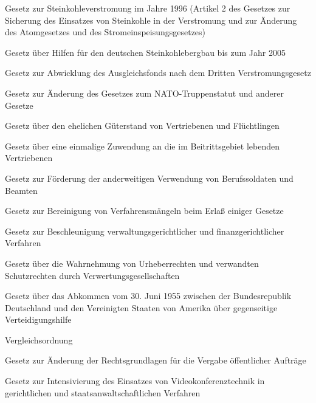 \item[{VerstromG-4}] Gesetz zur Steinkohleverstromung im Jahre 1996 (Artikel 2 des Gesetzes zur Sicherung des Einsatzes von Steinkohle in der Verstromung und zur Änderung des Atomgesetzes und des Stromeinspeisungsgesetzes)

\item[{VerstromG-5}] Gesetz über Hilfen für den deutschen Steinkohlebergbau bis zum Jahr 2005

\item[{VerstromG3AbwG}] Gesetz zur Abwicklung des Ausgleichsfonds nach dem Dritten Verstromungsgesetz

\item[{VertLastÄndG}] Gesetz zur Änderung des Gesetzes zum NATO-Truppenstatut und anderer Gesetze

\item[{VertrGüterstG}] Gesetz über den ehelichen Güterstand von Vertriebenen und Flüchtlingen

\item[{VertrZuwG}] Gesetz über eine einmalige Zuwendung an die im Beitrittsgebiet lebenden Vertriebenen

\item[{VerwFöG}] Gesetz zur Förderung der anderweitigen Verwendung von Berufssoldaten und Beamten

\item[{VfMängelBerG}] Gesetz zur Bereinigung von Verfahrensmängeln beim Erlaß einiger Gesetze

\item[{VGFGVfBeschlG}] Gesetz zur Beschleunigung verwaltungsgerichtlicher und finanzgerichtlicher Verfahren

\item[{VGG}] Gesetz über die Wahrnehmung von Urheberrechten und verwandten Schutzrechten durch Verwertungsgesellschaften

\item[{VgHilAbkUSAG}] Gesetz über das Abkommen vom 30. Juni 1955 zwischen der Bundesrepublik Deutschland und den Vereinigten Staaten von Amerika über gegenseitige Verteidigungshilfe

\item[{VglO}] Vergleichsordnung

\item[{VgRÄG}] Gesetz zur Änderung der Rechtsgrundlagen für die Vergabe öffentlicher Aufträge

\item[{VideokonfIntensG}] Gesetz zur Intensivierung des Einsatzes von Videokonferenztechnik in gerichtlichen und staatsanwaltschaftlichen Verfahren

